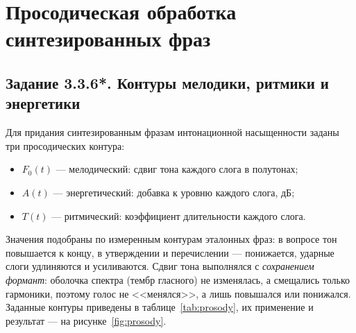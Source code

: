 \section{Просодическая обработка синтезированных фраз}

\subsection{Задание 3.3.6*. Контуры мелодики, ритмики и энергетики}

Для придания синтезированным фразам интонационной насыщенности заданы три
просодических контура:
\begin{itemize}
	\item $F_0(t)$ --- мелодический: сдвиг тона каждого слога в полутонах;
	\item $A(t)$ --- энергетический: добавка к уровню каждого слога, дБ;
	\item $T(t)$ --- ритмический: коэффициент длительности каждого слога.
\end{itemize}
Значения подобраны по измеренным контурам эталонных фраз: в вопросе тон
повышается к концу, в утверждении и перечислении --- понижается, ударные
слоги удлиняются и усиливаются. Сдвиг тона выполнялся с \emph{сохранением
формант}: оболочка спектра (тембр гласного) не изменялась, а смещались
только гармоники, поэтому голос не <<менялся>>, а лишь повышался или
понижался. Заданные контуры приведены в таблице~\ref{tab:prosody}, их
применение и результат --- на рисунке~\ref{fig:prosody}.

